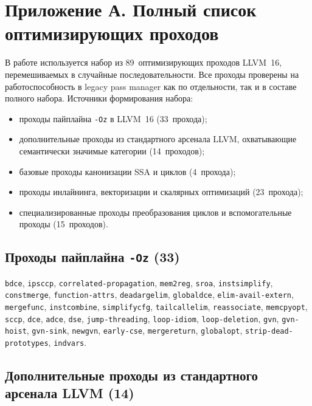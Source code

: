 \appendix

\section*{Приложение А. Полный список оптимизирующих проходов}

В работе используется набор из 89~оптимизирующих проходов LLVM~16, перемешиваемых в случайные последовательности. Все проходы проверены на работоспособность в legacy pass manager как по отдельности, так и в составе полного набора. Источники формирования набора:

\begin{itemize}
    \item проходы пайплайна \texttt{-Oz} в LLVM~16 (33~прохода);
    \item дополнительные проходы из стандартного арсенала LLVM, охватывающие семантически значимые категории (14~проходов);
    \item базовые проходы канонизации SSA и циклов (4~прохода);
    \item проходы инлайнинга, векторизации и скалярных оптимизаций (23~прохода);
    \item специализированные проходы преобразования циклов и вспомогательные проходы (15~проходов).
\end{itemize}

\subsection*{Проходы пайплайна \texttt{-Oz} (33)}

\begin{flushleft}
\texttt{bdce}, \texttt{ipsccp}, \texttt{correlated-propagation}, \texttt{mem2reg}, \texttt{sroa}, \texttt{instsimplify}, \texttt{constmerge}, \texttt{function-attrs}, \texttt{deadargelim}, \texttt{globaldce}, \texttt{elim-avail-extern}, \texttt{mergefunc}, \texttt{instcombine}, \texttt{simplifycfg}, \texttt{tailcallelim}, \texttt{reassociate}, \texttt{memcpyopt}, \texttt{sccp}, \texttt{dce}, \texttt{adce}, \texttt{dse}, \texttt{jump-threading}, \texttt{loop-idiom}, \texttt{loop-deletion}, \texttt{gvn}, \texttt{gvn-hoist}, \texttt{gvn-sink}, \texttt{newgvn}, \texttt{early-cse}, \texttt{mergereturn}, \texttt{globalopt}, \texttt{strip-dead-prototypes}, \texttt{indvars}.
\end{flushleft}

\subsection*{Дополнительные проходы из стандартного арсенала LLVM (14)}

